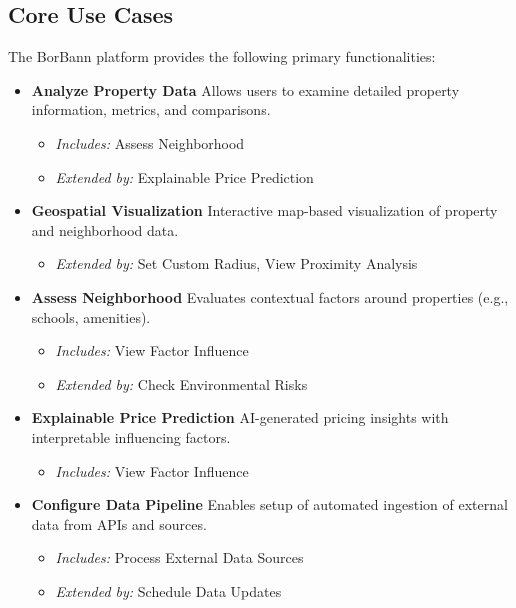 \subsection{Core Use Cases}

The BorBann platform provides the following primary functionalities:

\begin{itemize}
	\item \textbf{Analyze Property Data}  
	      Allows users to examine detailed property information, metrics, and comparisons.  
	      \begin{itemize}
	      	\item \textit{Includes:} Assess Neighborhood
	      	\item \textit{Extended by:} Explainable Price Prediction
	      \end{itemize}
	      
	\item \textbf{Geospatial Visualization}  
	      Interactive map-based visualization of property and neighborhood data.  
	      \begin{itemize}
	      	\item \textit{Extended by:} Set Custom Radius, View Proximity Analysis
	      \end{itemize}
	      
	\item \textbf{Assess Neighborhood}  
	      Evaluates contextual factors around properties (e.g., schools, amenities).  
	      \begin{itemize}
	      	\item \textit{Includes:} View Factor Influence
	      	\item \textit{Extended by:} Check Environmental Risks
	      \end{itemize}
	      
	\item \textbf{Explainable Price Prediction}  
	      AI-generated pricing insights with interpretable influencing factors.  
	      \begin{itemize}
	      	\item \textit{Includes:} View Factor Influence
	      \end{itemize}
	      
	\item \textbf{Configure Data Pipeline}  
	      Enables setup of automated ingestion of external data from APIs and sources.  
	      \begin{itemize}
	      	\item \textit{Includes:} Process External Data Sources
	      	\item \textit{Extended by:} Schedule Data Updates
	      \end{itemize}
\end{itemize}

